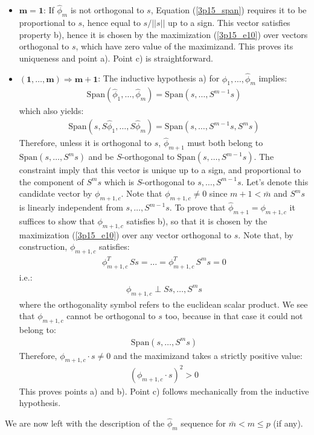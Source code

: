 \begin{itemize}
\item $\mathbf{m = 1}$: If $\hat{\phi}_m$ is not orthogonal to $s$, Equation (\ref{3p15_span}) requires
it to be proportional to $s$, hence equal to $s / ||s||$ up to a sign. This vector satisfies
property b), hence it is chosen by the maximization (\ref{3p15_e10}) over vectors orthogonal to $s$,
which have zero value of the maximizand. This proves its uniqueness and point a). Point c) is
straightforward.
\item $\mathbf{(1, \ldots, m) \Rightarrow m + 1}$: The inductive hypothesis a) for $\hat{\phi}_1, \ldots, \hat{\phi}_m$ implies:
\begin{eqnarray*}
\textrm{Span}\left(\hat{\phi}_1, \ldots, \hat{\phi}_m \right) = \textrm{Span} \left( s, \ldots, S^{m - 1}s \right)
\end{eqnarray*}
which also yields:
\begin{eqnarray*}
\textrm{Span}\left(s, S\hat{\phi}_1, \ldots, S\hat{\phi}_m \right) = \textrm{Span} \left( s, \ldots, S^{m - 1}s, S^m s \right)
\end{eqnarray*}
Therefore, unless it is orthogonal to $s$, $\hat{\phi}_{m + 1}$ must both belong to $\textrm{Span} \left( s, \ldots, S^m s \right)$ and be $S$-orthogonal to $\textrm{Span} \left( s, \ldots, S^{m - 1}s \right)$. The constraint imply that this vector is unique up to a sign, and proportional to the component of $S^m s$ which is $S$-orthogonal to $s, \ldots, S^{m - 1}s$. Let's denote this candidate
vector by $\phi_{m+1,c}$. Note that $\phi_{m+1,c} \neq 0$ since $m + 1 < \bar{m}$ and $S^m s$ is linearly independent from $s, \ldots, S^{m - 1}s$. To prove that $\hat{\phi}_{m + 1} = \phi_{m + 1, c}$ it suffices to show that $\phi_{m + 1, c}$ satisfies b), so that it is chosen by the maximization (\ref{3p15_e10}) over any vector orthogonal to $s$. Note that, by construction, $\phi_{m + 1, c}$ satisfies:
\begin{eqnarray*}
\phi_{m + 1, c}^T\, S s = \ldots = \phi_{m + 1, c}^T\, S^{m} s = 0
\end{eqnarray*}
i.e.:
\begin{eqnarray*}
\phi_{m + 1, c} \perp Ss, \ldots, S^{m} s
\end{eqnarray*}
where the orthogonality symbol refers to the euclidean scalar product. We see that $\phi_{m + 1, c}$
cannot be orthogonal to $s$ too, because in that case it could not belong to:
\begin{eqnarray*}
\textrm{Span} \left( s, \ldots, S^m s \right)
\end{eqnarray*}
Therefore, $\phi_{m + 1, c} \cdot s \neq 0$ and the maximizand takes a strictly positive value:
\begin{eqnarray*}
\left( \phi_{m + 1, c} \cdot s \right)^2 > 0
\end{eqnarray*}
This proves points a) and b). Point c) follows mechanically from the inductive hypothesis.
\end{itemize}
We are now left with the description of the $\hat{\phi}_m$ sequence for $\bar{m} < m \leq p$ (if any).

